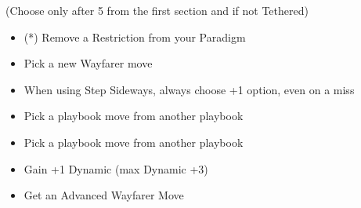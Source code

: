 \documentclass[
  oneside,
  statementpaper,
  9pt]{memoir}
\begin{document}
(Choose only after 5 from the first section and if not Tethered)

\begin{itemize}
\tightlist
\item
  (*) Remove a Restriction from your Paradigm
\item
  Pick a new Wayfarer move
\item
  When using Step Sideways, always choose +1 option, even on a miss
\item
  Pick a playbook move from another playbook
\item
  Pick a playbook move from another playbook
\item
  Gain +1 Dynamic (max Dynamic +3)
\item
  Get an Advanced Wayfarer Move
\end{itemize}

\newpage

\setlength{\parindent}{1em}
\end{document}
